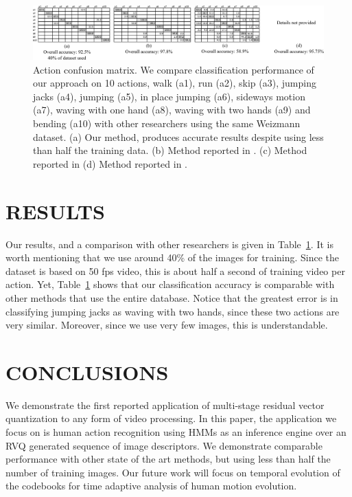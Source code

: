 \documentclass{article}
\begin{document}
			\begin{figure}				
					\includegraphics[width=1.0\textwidth]{figs/RVQ_HMM_IPCV2010_tabularResults}
					\centering
					\caption{Action confusion matrix.  We compare classification performance of our approach on 10 actions, walk (a1), run (a2), skip (a3), jumping jacks (a4), jumping (a5), in place jumping (a6), sideways motion (a7), waving with one hand (a8), waving with two hands (a9) and bending (a10) with other researchers using the same Weizmann dataset. (a) Our method, produces accurate results despite using less than half the training data. (b) Method reported in \cite{2007_JNL_SpaceTimeShapes_Gorelick}. (c) Method reported in \cite{2001_CNF_EventBasedAnalysisVideo_Manor} (d) Method reported in \cite{2010_JNL_ActionReconKinematic_Ali}.}
					\label{fig:Table}
			\end{figure}




\section{RESULTS}
Our results, and a comparison with other researchers is given in Table~\ref{fig:Table}.  It is worth mentioning that we use around 40\% of the images for training.  Since the dataset is based on 50 fps video, this is about half a second of training video per action.  Yet, Table~\ref{fig:Table} shows that our classification accuracy is comparable with other methods that use the entire database.  Notice that the greatest error is in classifying jumping jacks as waving with two hands, since these two actions are very similar.  Moreover, since we use very few images, this is understandable.  


\section{CONCLUSIONS}
We demonstrate the first reported application of multi-stage residual vector quantization to any form of video processing.  In this paper, the application we focus on is human action recognition using HMMs as an inference engine over an RVQ generated sequence of image descriptors.  We demonstrate comparable performance with other state of the art methods, but using less than half the number of training images.  Our future work will focus on temporal evolution of the codebooks for time adaptive analysis of human motion evolution.
\end{document}
